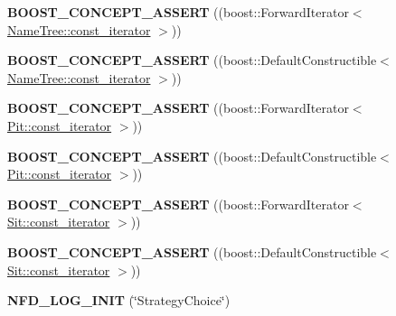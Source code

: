 \begin{DoxyCompactItemize}
\item 
{\bfseries B\+O\+O\+S\+T\+\_\+\+C\+O\+N\+C\+E\+P\+T\+\_\+\+A\+S\+S\+E\+RT} ((boost\+::\+Forward\+Iterator$<$ \hyperlink{classnfd_1_1NameTree_1_1const__iterator}{Name\+Tree\+::const\+\_\+iterator} $>$))\hypertarget{namespacenfd_a924dcb2b8622218b94162312638a0130}{}\label{namespacenfd_a924dcb2b8622218b94162312638a0130}

\item 
{\bfseries B\+O\+O\+S\+T\+\_\+\+C\+O\+N\+C\+E\+P\+T\+\_\+\+A\+S\+S\+E\+RT} ((boost\+::\+Default\+Constructible$<$ \hyperlink{classnfd_1_1NameTree_1_1const__iterator}{Name\+Tree\+::const\+\_\+iterator} $>$))\hypertarget{namespacenfd_aa3b0e6092b80a553159dfc06b1c288fe}{}\label{namespacenfd_aa3b0e6092b80a553159dfc06b1c288fe}

\item 
{\bfseries B\+O\+O\+S\+T\+\_\+\+C\+O\+N\+C\+E\+P\+T\+\_\+\+A\+S\+S\+E\+RT} ((boost\+::\+Forward\+Iterator$<$ \hyperlink{classnfd_1_1Pit_1_1const__iterator}{Pit\+::const\+\_\+iterator} $>$))\hypertarget{namespacenfd_a76bad38f6ea14b84c8791f0e3bddc3c8}{}\label{namespacenfd_a76bad38f6ea14b84c8791f0e3bddc3c8}

\item 
{\bfseries B\+O\+O\+S\+T\+\_\+\+C\+O\+N\+C\+E\+P\+T\+\_\+\+A\+S\+S\+E\+RT} ((boost\+::\+Default\+Constructible$<$ \hyperlink{classnfd_1_1Pit_1_1const__iterator}{Pit\+::const\+\_\+iterator} $>$))\hypertarget{namespacenfd_a6674d3c7d825e3d0ab342db2f32cf46e}{}\label{namespacenfd_a6674d3c7d825e3d0ab342db2f32cf46e}

\item 
{\bfseries B\+O\+O\+S\+T\+\_\+\+C\+O\+N\+C\+E\+P\+T\+\_\+\+A\+S\+S\+E\+RT} ((boost\+::\+Forward\+Iterator$<$ \hyperlink{classnfd_1_1Sit_1_1const__iterator}{Sit\+::const\+\_\+iterator} $>$))\hypertarget{namespacenfd_a907830b3943012eb563f0caf4a236b72}{}\label{namespacenfd_a907830b3943012eb563f0caf4a236b72}

\item 
{\bfseries B\+O\+O\+S\+T\+\_\+\+C\+O\+N\+C\+E\+P\+T\+\_\+\+A\+S\+S\+E\+RT} ((boost\+::\+Default\+Constructible$<$ \hyperlink{classnfd_1_1Sit_1_1const__iterator}{Sit\+::const\+\_\+iterator} $>$))\hypertarget{namespacenfd_ae20d4f2c63c09fb5493af0ab7729fcd7}{}\label{namespacenfd_ae20d4f2c63c09fb5493af0ab7729fcd7}

\item 
{\bfseries N\+F\+D\+\_\+\+L\+O\+G\+\_\+\+I\+N\+IT} (\char`\"{}Strategy\+Choice\char`\"{})\hypertarget{namespacenfd_ae51eba1ba3c4e0d88020f406f31e3b1e}{}\label{namespacenfd_ae51eba1ba3c4e0d88020f406f31e3b1e}

\end{DoxyCompactItemize}
